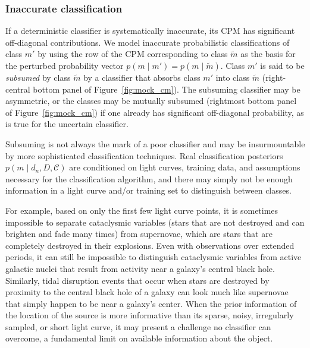 \subsubsection{Inaccurate classification}
\label{sec:inaccuratedata}

If a deterministic classifier is systematically inaccurate, its CPM has significant off-diagonal contributions.
We model inaccurate probabilistic classifications of class $m'$ by using the row of the CPM corresponding to class $\tilde{m}$ as the basis for the perturbed probability vector $p(m \mid m') = p(m \mid \tilde{m})$.
Class $m'$ is said to be \textit{subsumed} by class $\tilde{m}$ by a classifier that absorbs class $m'$ into class $\tilde{m}$ (right-central bottom panel of Figure~\ref{fig:mock_cm}).
The subsuming classifier may be asymmetric, or the classes may be mutually subsumed (rightmost bottom panel of Figure~\ref{fig:mock_cm}) if one already has significant off-diagonal probability, as is true for the uncertain classifier.

Subsuming is not always the mark of a poor classifier and may be insurmountable by more sophisticated classification techniques.
Real classification posteriors $p(m \mid d_{n}, D, \mathcal{C})$ are conditioned on light curves, training data, and assumptions necessary for the classification algorithm, and there may simply not be enough information in a light curve and/or training set to distinguish between classes.

For example, based on only the first few light curve points, it is sometimes impossible to separate cataclysmic variables (stars that are not destroyed and can brighten and fade many times) from supernovae, which are stars that are completely destroyed in their explosions.
Even with observations over extended periods, it can still be impossible to distinguish cataclysmic variables from active galactic nuclei that result from activity near a galaxy's central black hole.
Similarly, tidal disruption events that occur when stars are destroyed by proximity to the central black hole of a galaxy can look much like supernovae that simply happen to be near a galaxy's center.
When the prior information of the location of the source is more informative than its sparse, noisy, irregularly sampled, or short light curve, it may present a challenge no classifier can overcome, a fundamental limit on available information about the object.

